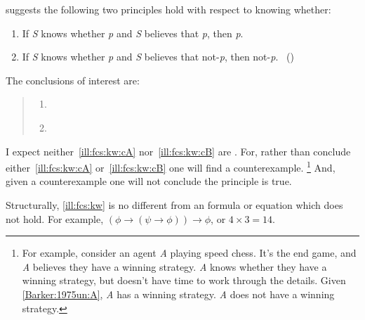 \begin{note}
  \begin{scenario}%
    \label{ill:fcs:kw}%
    \citeauthor{Barker:1975un} suggests the following two principles hold with respect to knowing whether:

    \begin{enumerate}[label=(\Alph*), ref=(\Alph*), noitemsep]
    \item
      \label{Barker:1975un:A}
      If \emph{S} knows whether \emph{p} and \emph{S} believes that \emph{p}, then \emph{p}.
    \item
      \label{Barker:1975un:B}
      If \emph{S} knows whether \emph{p} and \emph{S} believes that not-\emph{p}, then not-\emph{p}.%
      \mbox{ }\hfill\mbox{(\citeyear[281]{Barker:1975un})}
    \end{enumerate}
  \end{scenario}

  \noindent The conclusions of interest are:

  \begin{quote}
  \begin{enumerate}[label=C\Alph*., ref=(C\Alph*), noitemsep]
  \item
    \label{ill:fcs:kw:cA}
  \item
    \label{ill:fcs:kw:cB}
  \end{enumerate}
\end{quote}

  \noindent I expect neither~\ref{ill:fcs:kw:cA} nor~\ref{ill:fcs:kw:cB} are .
  For, rather than conclude either~\ref{ill:fcs:kw:cA} or~\ref{ill:fcs:kw:cB} one will find a counterexample.%
  \footnote{
    For example, consider an agent \emph{A} playing speed chess.
    It's the end game, and \emph{A} believes they have a winning strategy.
    \emph{A} knows whether they have a winning strategy, but doesn't have time to work through the details.
    Given \ref{Barker:1975un:A}, \emph{A} has a winning strategy.
    \emph{A} does not have a winning strategy.
  }
  And, given a counterexample one will not conclude the principle is true.
\end{note}

\begin{note}
  Structurally, \autoref{ill:fcs:kw} is no different from an formula or equation which does not hold.
  For example, \((\phi \rightarrow (\psi \rightarrow \phi)) \rightarrow \phi\), or \(4 \times 3 = 14\).
\end{note}

